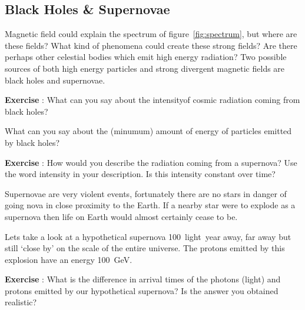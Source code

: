 \subsection{Black Holes \& Supernovae}
Magnetic field could explain the spectrum of figure~\ref{fig:spectrum}, but where are these fields? What kind of phenomena could create these strong fields? Are there perhaps other celestial bodies which emit high energy radiation? Two possible sources of both high energy particles and strong divergent magnetic fields are black holes and supernovae.

\begin{shaded}
\textbf{Exercise \theExercise {}} : What can you say about the intensity\footnotemark of cosmic radiation coming from black holes?

What can you say about the (minumum) amount of energy of particles emitted by black holes?\end{shaded}

\begin{shaded}
\textbf{Exercise \theExercise {}} : How would you describe the radiation coming from a supernova? Use the word intensity in your description. Is this intensity constant over time?\end{shaded}

Supernovae are very violent events, fortunately there are no stars in danger of going nova in close proximity to the Earth. If a nearby star were to explode as a supernova then life on Earth would almost certainly cease to be.

Lets take a look at a hypothetical supernova 100~light~year away, far away but still `close by' on the scale of the entire universe. The protons emitted by this explosion have an energy 100~GeV.
\begin{shaded}
\textbf{Exercise \theExercise {}} : What is the difference in arrival times of the photons (light) and protons emitted by our hypothetical supernova? Is the answer you obtained realistic?\end{shaded}

